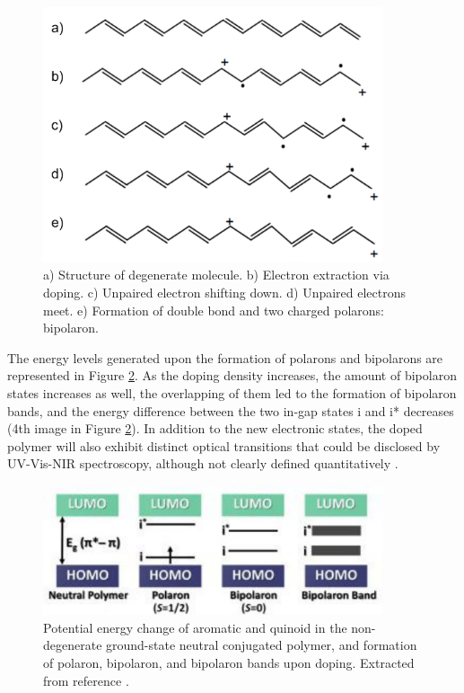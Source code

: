 \begin{figure}[h]
  \centering
  \includegraphics[width=10cm]{Images/pdf/bipolaron.pdf}
  \caption[Representation of bipolaron formation introduced via doping]{a) Structure of degenerate molecule. b) Electron extraction via doping. c) Unpaired electron shifting down. d) Unpaired electrons meet. e) Formation of double bond and two charged polarons: bipolaron.}
  \label{fig:bipol}
\end{figure}

The energy levels generated upon the formation of polarons and bipolarons are represented in Figure \ref{fig:ebipol}. As the doping density increases, the amount of bipolaron states increases as well, the overlapping of them led to the formation of bipolaron bands, and the energy difference between the two in-gap states i and i* decreases (4th image in Figure \ref{fig:ebipol}). %
In addition to the new electronic states, the doped polymer will also exhibit distinct optical transitions that could be disclosed by UV-Vis-NIR spectroscopy, although not clearly defined quantitatively \cite{heydarigharahcheshmehTextureNanostructuralEngineering2020}.

\begin{figure}[h]
  \centering
  \includegraphics[width=10cm]{Images/pdf/bi-polaron.pdf}
  \caption[Formation of polaron, bipolaron, and bipolaron band]{Potential energy change of aromatic and quinoid in the non-degenerate ground-state neutral conjugated polymer, and formation of polaron, bipolaron, and bipolaron bands upon doping. Extracted from reference \cite{heydarigharahcheshmehTextureNanostructuralEngineering2020}.}
  \label{fig:ebipol}
\end{figure}

